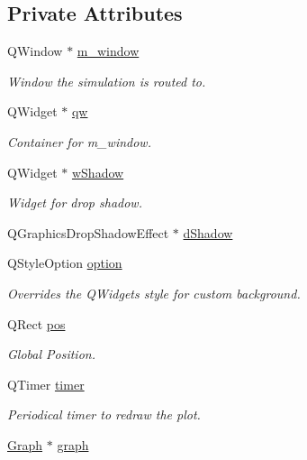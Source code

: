 \subsection*{Private Attributes}
\begin{DoxyCompactItemize}
\item 
Q\+Window $\ast$ \mbox{\hyperlink{classFluid_a138f09aa54f3209e67bf3e0a847bcdbc}{m\+\_\+window}}
\begin{DoxyCompactList}\small\item\em Window the simulation is routed to. \end{DoxyCompactList}\item 
Q\+Widget $\ast$ \mbox{\hyperlink{classFluid_a38ced692400072201566af41fd8fe5cd}{qw}}
\begin{DoxyCompactList}\small\item\em Container for m\+\_\+window. \end{DoxyCompactList}\item 
Q\+Widget $\ast$ \mbox{\hyperlink{classFluid_a55892004855abbf3458402a674add0e4}{w\+Shadow}}
\begin{DoxyCompactList}\small\item\em Widget for drop shadow. \end{DoxyCompactList}\item 
Q\+Graphics\+Drop\+Shadow\+Effect $\ast$ \mbox{\hyperlink{classFluid_a3e51c9ed538056955fd16efd6b8519a2}{d\+Shadow}}
\item 
Q\+Style\+Option \mbox{\hyperlink{classFluid_afcdad9ca2270eca892ebe19cc6eb0792}{option}}
\begin{DoxyCompactList}\small\item\em Overrides the Q\+Widget\textquotesingle{}s style for custom background. \end{DoxyCompactList}\item 
Q\+Rect \mbox{\hyperlink{classFluid_acc8b08224f3d6ee3a6d662c27562e1ab}{pos}}
\begin{DoxyCompactList}\small\item\em Global Position. \end{DoxyCompactList}\item 
Q\+Timer \mbox{\hyperlink{classFluid_a0765840a82e6ec401dea0cb65c435f5f}{timer}}
\begin{DoxyCompactList}\small\item\em Periodical timer to redraw the plot. \end{DoxyCompactList}\item 
\mbox{\hyperlink{classGraph}{Graph}} $\ast$ \mbox{\hyperlink{classFluid_a709eabc9846a8e29c79285c17b8b07ca}{graph}}

\end{DoxyCompactItemize}
